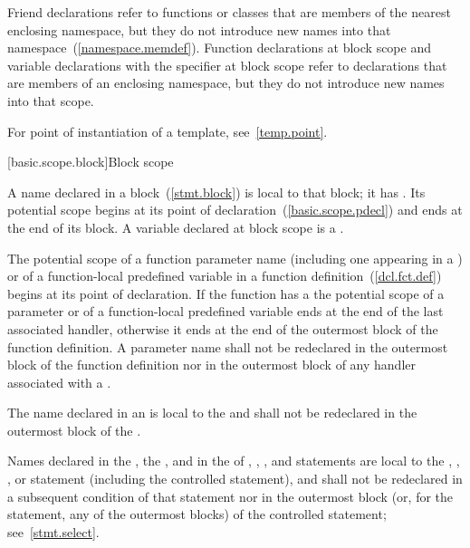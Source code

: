 \pnum
\begin{note} Friend declarations refer to functions or classes that are
members of the nearest enclosing namespace, but they do not introduce
new names into that namespace~(\ref{namespace.memdef}). Function
declarations at block scope and variable declarations with the
 specifier at block scope refer to declarations that are
members of an enclosing namespace, but they do not introduce new names
into that scope.
\end{note}

\pnum
\begin{note} For point of instantiation of a template,
see~\ref{temp.point}.\end{note}%

[basic.scope.block]{Block scope}

\pnum
{}%
%
A name declared in a block~(\ref{stmt.block}) is local to that block; it has
.
Its potential scope begins at its point of
declaration~(\ref{basic.scope.pdecl}) and ends at the end of its block.
A variable declared at block scope is a .

\pnum
{}%
The potential scope of a function parameter name
(including one appearing in a
)
or of a function-local predefined variable
in a function
definition~(\ref{dcl.fct.def}) begins at its point of declaration. If
the function has a  the potential scope of
a parameter
or of a function-local predefined variable
ends at the end of the last associated handler, otherwise it ends
at the end of the outermost block of the function definition. A
parameter name shall not be redeclared in the outermost block of the
function definition nor in the outermost block of any handler associated
with a .

\pnum
{}%
The name declared in an 
is local to the
 and shall not be redeclared in the outermost block of the
.

\pnum
Names declared in the , the , and in the
 of , , , and
 statements are local to the , ,
, or  statement (including the controlled
statement), and shall not be redeclared in a subsequent condition of
that statement nor in the outermost block (or, for the 
statement, any of the outermost blocks) of the controlled statement;
see~\ref{stmt.select}.

